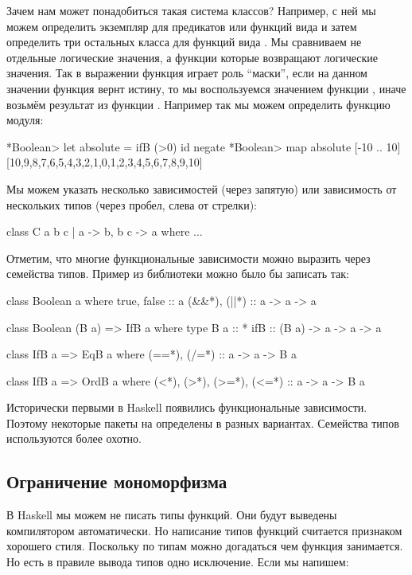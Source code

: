 Зачем нам может понадобиться такая система классов? Например, с ней мы
можем определить экземпляр  для предикатов или функций вида
 и затем определить три остальных класса для функций вида
. Мы сравниваем не отдельные логические значения, а функции
которые возвращают логические значения. Так в выражении 
функция  играет роль ``маски'', если на данном значении функция
 вернт истину, то мы воспользуемся значением функции , иначе
возьмём результат из функции . Например так мы можем определить
функцию модуля:


\begin{code}
*Boolean> let absolute = ifB (>0) id negate
*Boolean> map absolute [-10 .. 10]
[10,9,8,7,6,5,4,3,2,1,0,1,2,3,4,5,6,7,8,9,10]
\end{code}

Мы можем указать несколько зависимостей (через запятую) или зависимость
от нескольких типов (через пробел, слева от стрелки):


\begin{code}
class C a b c | a -> b, b c -> a where
    ...
\end{code}

Отметим, что многие функциональные зависимости можно выразить через
семейства типов. Пример из библиотеки  можно было бы
записать так:


\begin{code}
class Boolean a where
    true, false     :: a
    (&&*), (||*)    :: a -> a -> a

class Boolean (B a) => IfB a where
    type B a :: *
    ifB :: (B a) -> a -> a -> a

class IfB a => EqB a where
    (==*), (/=*) :: a -> a -> B a
               
class IfB a => OrdB a where
    (<*), (>*), (>=*), (<=*) :: a -> a -> B a
\end{code}

Исторически первыми в Haskell появились функциональные зависимости.
Поэтому некоторые пакеты на  определены в разных вариантах.
Семейства типов используются более охотно.

\subsection{Ограничение мономорфизма}

В Haskell мы можем не писать типы функций. Они будут выведены
компилятором автоматически. Но написание типов функций считается
признаком хорошего стиля. Поскольку по типам можно догадаться чем
функция занимается. Но есть в правиле вывода типов одно исключение. Если
мы напишем:


